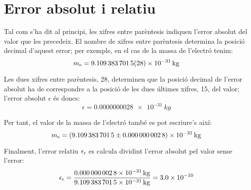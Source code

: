    
  
  
  
  
  
 \index{$\sigma$}  


\section{Error absolut i relatiu}\label{err_abs_rel}

Tal com s'ha dit al principi, les xifres entre parèntesis indiquen l'error absolut del valor que les precedeix. El nombre de xifres entre parèntesis determina la posició decimal d'aquest error; per exemple, en el cas de la  massa de l'electró tenim:
\[
    m\ped{e} = \SI{9,109 383 7015(28) e-31}{kg}
\]

Les dues xifres entre parèntesis, 28, determinen que la posició decimal de l'error absolut ha de correspondre a la posició de les dues últimes xifres, 15, del valor; l'error absolut $\epsilon$  és doncs:
\[
    \epsilon = \SI{0,000 000 0028 e-31}{kg}
\]

Per tant, el valor de la massa de l'electró també es pot escriure's així:
 \[
    m\ped{e} = \SI[separate-uncertainty]{9,109 383 7015(28) e-31}{kg}
\]

Finalment, l'error relatiu $\epsilon\ped{r}$ es calcula dividint l'error absolut pel valor sense l'error:
\[
    \epsilon\ped{r} = \frac{\SI{0,000 000 0028 e-31}{kg}}{\SI{9,109 383 7015 e-31}{kg}} =   \num{3,0e-10}
\]
